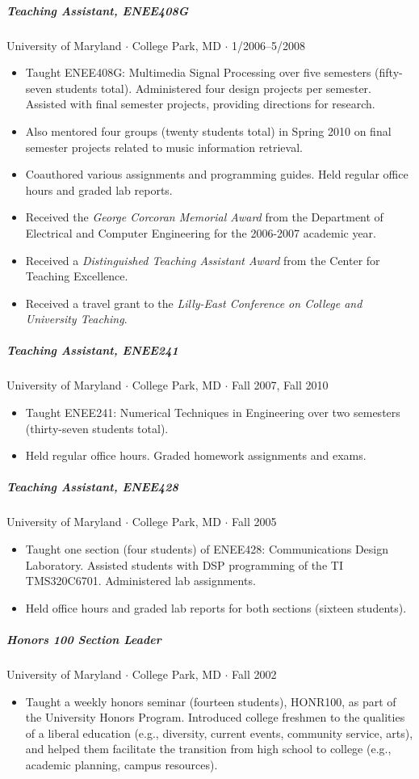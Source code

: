 \documentclass[10pt,letterpaper]{article}
\begin{document}
\subparagraph{Teaching Assistant, ENEE408G} 
University of Maryland $\cdot$ College Park, MD $\cdot$ 1/2006--5/2008
\begin{itemize}
\item Taught ENEE408G: Multimedia Signal Processing over five semesters (fifty-seven students total). Administered four design projects per semester. Assisted with final semester projects, providing directions for research. 
\item Also mentored four groups (twenty students total) in Spring 2010 on final semester projects related to music information retrieval.
\item Coauthored various assignments and programming guides. Held regular office hours and graded lab reports.
\item Received the \textit{George Corcoran Memorial Award} from the Department of Electrical and Computer Engineering for the 2006-2007 academic year.
\item Received a \textit{Distinguished Teaching Assistant Award} from the Center for Teaching Excellence. 
\item Received a travel grant to the \textit{Lilly-East Conference on College and University Teaching}.
\end{itemize}

\subparagraph{Teaching Assistant, ENEE241}
University of Maryland $\cdot$ College Park, MD $\cdot$ Fall 2007, Fall 2010
\begin{itemize}
\item Taught ENEE241: Numerical Techniques in Engineering over two semesters (thirty-seven students total).
\item Held regular office hours. Graded homework assignments and exams.
\end{itemize}

\subparagraph{Teaching Assistant, ENEE428}
University of Maryland $\cdot$ College Park, MD $\cdot$ Fall 2005
\begin{itemize}
	\item Taught one section (four students) of ENEE428: Communications Design Laboratory. Assisted students with DSP programming of the TI TMS320C6701. Administered lab assignments.
\item Held office hours and graded lab reports for both sections (sixteen students).
\end{itemize}

\subparagraph{Honors 100 Section Leader}
University of Maryland $\cdot$ College Park, MD $\cdot$ Fall 2002
\begin{itemize}
	\item Taught a weekly honors seminar (fourteen students), HONR100, as part of the University Honors Program. Introduced college freshmen to the qualities of a liberal education (e.g., diversity, current events, community service, arts), and helped them facilitate the transition from high school to college (e.g., academic planning, campus resources).
\end{itemize}
\end{document}
